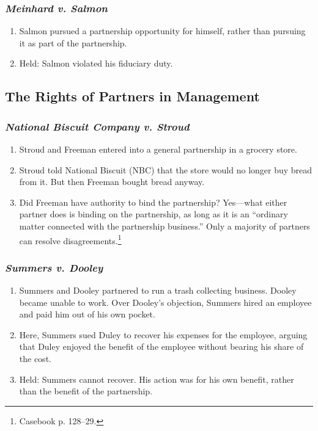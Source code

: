 \subsubsection{\emph{Meinhard v. Salmon}}
\label{par:meinhard}
\begin{enumerate}
    \item Salmon pursued a partnership opportunity for himself, rather than 
    pursuing it as part of the partnership.
    \item Held: Salmon violated his fiduciary duty.
\end{enumerate}

\subsection{The Rights of Partners in Management}

\subsubsection{\emph{National Biscuit Company v. Stroud}}
\label{par:biscuit}
\begin{enumerate}
    \item Stroud and Freeman entered into a general partnership in a grocery 
    store.
    \item Stroud told National Biscuit (NBC) that the store would no longer 
    buy bread from it. But then Freeman bought bread anyway.
    \item Did Freeman have authority to bind the partnership? Yes---what 
    either partner does is binding on the partnership, as long as it is an 
    ``ordinary matter connected with the partnership business.'' Only a 
    majority of partners can resolve disagreements.\footnote{Casebook p. 
    128--29.}
\end{enumerate}

\subsubsection{\emph{Summers v. Dooley}}
\label{par:summers}
\begin{enumerate}
    \item Summers and Dooley partnered to run a trash collecting business. 
    Dooley became unable to work. Over Dooley's objection, Summers hired an 
    employee and paid him out of his own pocket.
    \item Here, Summers sued Duley to recover his expenses for the employee, 
    arguing that Duley enjoyed the benefit of the employee without bearing his 
    share of the cost.
    \item Held: Summers cannot recover. His action was for his own benefit, 
    rather than the benefit of the partnership. 
\end{enumerate}

